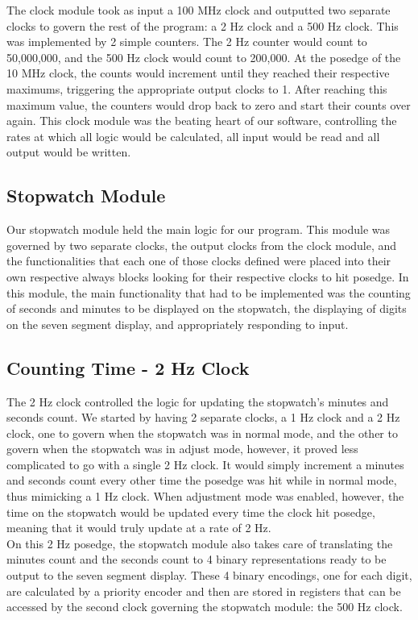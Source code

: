\documentclass{article}
\begin{document}
The clock module took as input a 100 MHz clock and outputted two separate clocks to govern the rest of the program: a 2 Hz clock and a 500 Hz clock.  This was implemented by 2 simple counters. The 2 Hz counter would count to 50,000,000, and the 500 Hz clock would count to 200,000.  At the posedge of the 10 MHz clock, the counts would increment until they reached their respective maximums, triggering the appropriate output clocks to 1. After reaching this maximum value, the counters would drop back to zero and start their counts over again.  This clock module was the beating heart of our software, controlling the rates at which all logic would be calculated, all input would be read and all output would be written.

\subsection*{Stopwatch Module}

Our stopwatch module held the main logic for our program. This module was governed by two separate clocks, the output clocks from the clock module, and the functionalities that each one of those clocks defined were placed into their own respective always blocks looking for their respective clocks to hit posedge. In this module, the main functionality that had to be implemented was the counting of seconds and minutes to be displayed on the stopwatch, the displaying of digits on the seven segment display, and appropriately responding to input.

\subsection*{Counting Time - 2 Hz Clock}

The 2 Hz clock controlled the logic for updating the stopwatch's minutes and seconds count.  We started by having 2 separate clocks, a 1 Hz clock and a 2 Hz clock, one to govern when the stopwatch was in normal mode, and the other to govern when the stopwatch was in adjust mode, however, it proved less complicated to go with a single 2 Hz clock. It would simply increment a minutes and seconds count every other time the posedge was hit while in normal mode, thus mimicking a 1 Hz clock.  When adjustment mode was enabled, however, the time on the stopwatch would be updated every time the clock hit posedge, meaning that it would truly update at a rate of 2 Hz.  \\

On this 2 Hz posedge, the stopwatch module also takes care of translating the minutes count and the seconds count to 4 binary representations ready to be output to the seven segment display. These 4 binary encodings, one for each digit, are calculated by a priority encoder and then are stored in registers that can be accessed by the second clock governing the stopwatch module: the 500 Hz clock.
\end{document}
